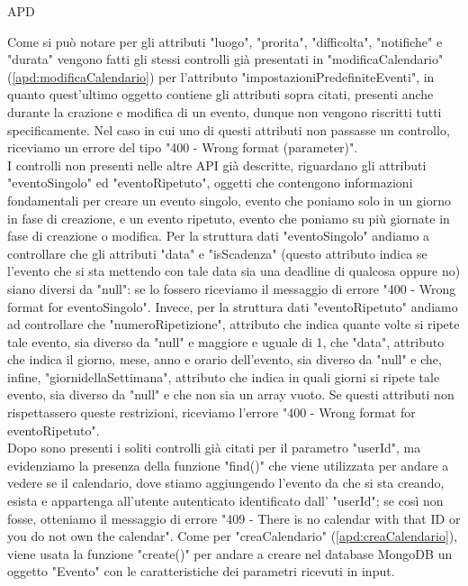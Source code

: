 \begin{listaPersonale} {APD}
\begin{listaPersonale2}[APD]{}
                Come si può notare per gli attributi "luogo", "prorita", "difficolta", "notifiche" e "durata" vengono fatti gli stessi controlli già presentati in "modificaCalendario" (\ref{apd:modificaCalendario}) per l'attributo "impostazioniPredefiniteEventi", in quanto quest'ultimo oggetto contiene gli attributi sopra citati, presenti anche durante la crazione e modifica di un evento, dunque non vengono riscritti tutti specificamente. Nel caso in cui uno di questi attributi non passasse un controllo, riceviamo un errore del tipo "400 - Wrong format (parameter)". \\
                I controlli non presenti nelle altre API già descritte, riguardano gli attributi "eventoSingolo" ed "eventoRipetuto", oggetti che contengono informazioni fondamentali per creare un evento singolo, evento che poniamo solo in un giorno in fase di creazione, e un evento ripetuto, evento che poniamo su più giornate in fase di creazione o modifica. Per la struttura dati "eventoSingolo" andiamo a controllare che gli attributi "data" e "isScadenza" (questo attributo indica se l'evento che si sta mettendo con tale data sia una deadline di qualcosa oppure no) siano diversi da "null": se lo fossero riceviamo il messaggio di errore "400 - Wrong format for eventoSingolo".  Invece, per la struttura dati "eventoRipetuto" andiamo ad controllare che "numeroRipetizione", attributo che indica quante volte si ripete tale evento, sia diverso da "null" e maggiore e uguale di 1, che "data", attributo che indica il giorno, mese, anno e orario dell'evento, sia diverso da "null" e che, infine, "giornidellaSettimana", attributo che indica in quali giorni si ripete tale evento, sia diverso da "null" e che non sia un array vuoto. Se questi attributi non rispettassero queste restrizioni, riceviamo l'errore "400 - Wrong format for eventoRipetuto". \\
                Dopo sono presenti i soliti controlli già citati per il parametro "userId", ma evidenziamo la presenza della funzione "find()" che viene utilizzata per andare a vedere se il calendario, dove stiamo aggiungendo l'evento da che si sta creando, esista e appartenga all'utente autenticato identificato dall' "userId"; se così non fosse, otteniamo il messaggio di errore  "409 - There is no calendar with that ID or you do not own the calendar". Come per "creaCalendario" (\ref{apd:creaCalendario}), viene usata la funzione "create()" per andare a creare nel database MongoDB un oggetto "Evento" con le caratteristiche dei parametri ricevuti in input.
                \begin{center}

\end{center}
\end{listaPersonale2}
\end{listaPersonale}
